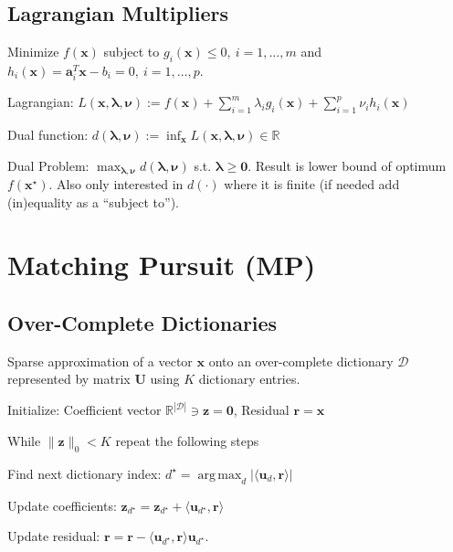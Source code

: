 \documentclass[a4paper, 11pt, landscape]{article}
\DeclareMathOperator*{\argmax}{arg\,max}
\begin{document}
\begin{multicols*}{3}
\subsection{Lagrangian Multipliers}
Minimize  $f(\mathbf{x})$ subject to $g_i(\mathbf{x}) \leq 0,\ i = 1, \ldots, m$ and $h_i(\mathbf{x}) = \mathbf{a}_i^T \mathbf{x} - b_i = 0,\ i = 1, \ldots, p$.
\begin{compactdesc}
	\item[Lagrangian:] $L(\mathbf{x}, \boldsymbol{\lambda}, \boldsymbol{\nu}) := f(\mathbf{x}) + \sum_{i=1}^m \lambda_i g_i(\mathbf{x}) + \sum_{i=1}^p \nu_i h_i(\mathbf{x})$
	\item[Dual function:] $d(\boldsymbol{\lambda}, \boldsymbol{\nu}) := \inf_{\mathbf{x}} L(\mathbf{x}, \boldsymbol{\lambda}, \boldsymbol{\nu}) \in \mathbb{R}$
	\item[Dual Problem:] $\max_{\boldsymbol{\lambda}, \boldsymbol{\nu}} d(\boldsymbol{\lambda}, \boldsymbol{\nu})$ s.t. $\boldsymbol{\lambda} \geq \mathbf{0}$. Result is lower bound of optimum $f(\mathbf{x}^\star)$. Also only interested in $d(\cdot)$ where it is finite (if needed add (in)equality as a ``subject to'').
\end{compactdesc}

\section{Matching Pursuit (MP)}
\subsection{Over-Complete Dictionaries}
Sparse approximation of a vector $\mathbf{x}$ onto an over-complete dictionary $\mathcal{D}$ represented by matrix $\mathbf{U}$ using $K$ dictionary entries.
\begin{compactenum}
	\item Initialize: Coefficient vector $\mathbb{R}^{|\mathcal{D}|} \ni \mathbf{z} = \mathbf{0}$, Residual $\mathbf{r} = \mathbf{x}$
	\item While $\|\mathbf{z}\|_0 < K$ repeat the following steps
	\item Find next dictionary index: $d^\star = \argmax_d |\langle \mathbf{u}_d, \mathbf{r} \rangle|$
	\item Update coefficients: $\mathbf{z}_{d^\star} = \mathbf{z}_{d^\star} + \langle \mathbf{u}_{d^\star}, \mathbf{r} \rangle$
	\item Update residual: $\mathbf{r} = \mathbf{r} - \langle \mathbf{u}_{d^\star}, \mathbf{r} \rangle \mathbf{u}_{d^\star}$.
\end{compactenum}


\end{multicols*}
\end{document}
